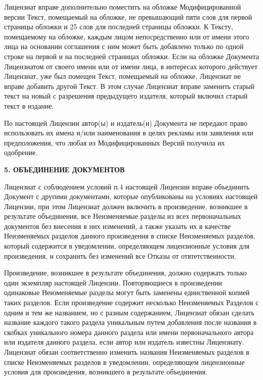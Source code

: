 Лицензиат вправе дополнительно поместить на обложке Модифицированной
версии Текст, помещаемый на обложке, не превышающий пяти слов для первой
страницы обложки и 25 слов для последней страницы обложки. К Тексту,
помещаемому на обложке, каждым лицом непосредственно или от имени этого
лица на основании соглашения с ним может быть добавлено только по одной
строке на первой и на последней страницах обложки. Если на обложке
Документа Лицензиатом от своего имени или от имени лица, в интересах
которого действует Лицензиат, уже был помещен Текст, помещаемый на
обложке, Лицензиат не вправе добавить другой Текст. В этом случае
Лицензиат вправе заменить старый текст на новый с разрешения предыдущего
издателя, который включил старый текст в издание.

По настоящей Лицензии автор(ы) и издатель(и) Документа не передают право
использовать их имена и/или наименования в целях рекламы или заявления
или предположения, что любая из Модифицированных Версий получила их
одобрение.


\begin{center}
{\Large\bf 5. ОБЪЕДИНЕНИЕ ДОКУМЕНТОВ\par}
\end{center}


Лицензиат с соблюдением условий п.4 настоящей Лицензии вправе объединить
Документ с другими документами, которые опубликованы на условиях
настоящей Лицензии, при этом Лицензиат должен включить в произведение,
возникшее в результате объединения, все Неизменяемые разделы из всех
первоначальных документов без внесения в них изменений, а также указать
их в качестве Неизменяемых разделов данного произведения в списке
Неизменяемых разделов, который содержится в уведомлении, определяющем
лицензионные условия для произведения, и сохранить без изменений все
Отказы от отвтетственности.

Произведение, возникшее в результате объединения, должно содержать
только один экземпляр настоящей Лицензии. Повторяющиеся в произведении
одинаковые Неизменяемые разделы могут быть заменены единственной копией
таких разделов. Если произведение содержит несколько Неизменяемых
Разделов с одним и тем же названием, но с разным содержанием, Лицензиат
обязан сделать название каждого такого раздела уникальным путем
добавления после названия в скобках уникального номера данного раздела
или имени первоначального автора или издателя данного раздела, если
автор или издатель известны Лицензиату. Лицензиат обязан соответственно
изменить названия Неизменяемых разделов в списке Неизменяемых разделов
в уведомлении, определяющем лицензионные условия для произведения,
возникшего в результате объединения.


